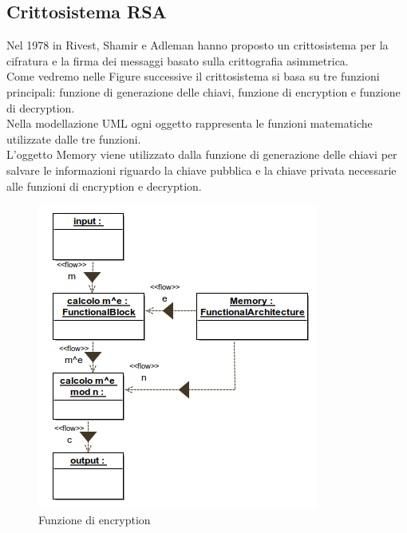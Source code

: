 \subsection{Crittosistema RSA}
Nel 1978 in \cite{RSA78} Rivest, Shamir e Adleman hanno proposto un crittosistema per la cifratura e la firma dei messaggi basato sulla crittografia asimmetrica.\\
Come vedremo nelle Figure successive il crittosistema si basa su tre funzioni principali: funzione di generazione delle chiavi, funzione di encryption e funzione di decryption.\\
Nella modellazione UML ogni oggetto rappresenta le funzioni matematiche utilizzate dalle tre funzioni.\\ 
L'oggetto Memory viene utilizzato dalla funzione di generazione delle chiavi per salvare le informazioni riguardo la chiave pubblica e la chiave privata necessarie alle funzioni di encryption e decryption.\\  

\begin{figure}[h!] 
    \centering 
    \includegraphics[scale=0.5]{../img/RSA/Encryption_Object_diagram.png} 
    \caption{Funzione di encryption} 
\end{figure}

